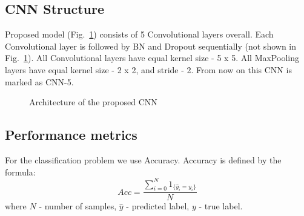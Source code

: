 \subsection{CNN Structure}
%

Proposed model (Fig.~\ref{ris:CNN_our}) consists of 5 Convolutional layers overall.
Each Convolutional layer is followed by BN and Dropout sequentially (not shown in Fig.~\ref{ris:CNN_our}).
All Convolutional layers have equal kernel size - 5 x 5.
All MaxPooling layers have equal kernel size - 2 x 2, and stride - 2.
From now on this CNN is marked as CNN-5.
\begin{figure}[ht]
	\caption{Architecture of the proposed CNN}
	\label{ris:CNN_our}
\end{figure}

\subsection{Performance metrics}
For the classification problem we use Accuracy.
Accuracy is defined by the formula:
\begin{equation}
Acc = \frac{\sum_{i=0}^{N} 1_{\{\hat{y}_i=y_i\}}}{N}
\end{equation}
where $N$ - number of samples, $\hat{y}$ - predicted label, $y$ - true label.

